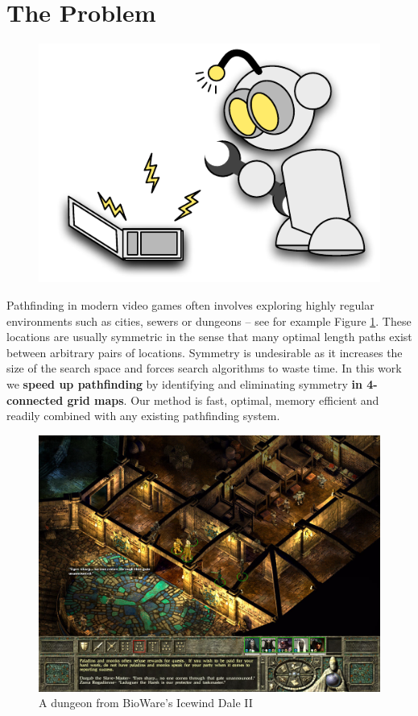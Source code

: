 \section{The Problem}
 \begin{figure}
\vspace{-3em}
		\includegraphics[width=0.30\columnwidth]{diagrams/robot_mechanic.pdf}
 \end{figure}

Pathfinding in modern video games often involves exploring highly regular 
environments such as cities, sewers or dungeons -- see for example
Figure \ref{fig:iw2}.
These locations are usually symmetric in the sense that many optimal 
length paths exist between arbitrary pairs of locations.
Symmetry is undesirable as it increases the size of the search space and forces
search algorithms to waste time.
\newline \newline
In this work we \textbf{speed up pathfinding} by identifying and eliminating
symmetry \textbf{in 4-connected grid maps}.
Our method is fast, optimal, memory efficient and readily combined with any
existing pathfinding system.

 \begin{figure}[h]
	\vspace{1em}
	\centering
	\label{fig:iw2}
		\includegraphics[width=\columnwidth]{diagrams/iwdale.jpg}
 \caption{A dungeon from BioWare's Icewind Dale II}
 \end{figure}

